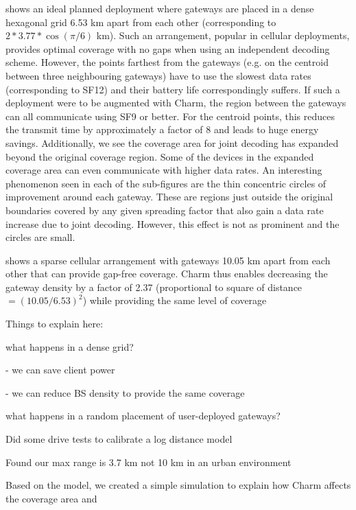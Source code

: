  shows an ideal planned deployment where gateways are placed in a dense hexagonal grid 6.53 km apart from each other (corresponding to $2*3.77*\cos(\pi/6)$ km). Such an arrangement, popular in cellular deployments, provides optimal coverage with no gaps when using an independent decoding scheme. However, the points farthest from the gateways (e.g. on the centroid between three neighbouring gateways) have to use the slowest data rates (corresponding to SF12) and their battery life correspondingly suffers. If such a deployment were to be augmented with Charm, the region between the gateways can all communicate using SF9 or better. For the centroid points, this reduces the transmit time by approximately a factor of 8 and leads to huge energy savings. Additionally, we see the coverage area for joint decoding has expanded beyond the original coverage region. Some of the devices in the expanded coverage area can even communicate with higher data rates. An interesting phenomenon seen in each of the sub-figures are the thin concentric circles of improvement around each gateway. These are regions just outside the original boundaries covered by any given spreading factor that also gain a data rate increase due to joint decoding. However, this effect is not as prominent and the circles are small.

 shows a sparse cellular arrangement with gateways 10.05 km apart from each other that can provide gap-free coverage. Charm thus enables decreasing the gateway density by a factor of 2.37 (proportional to square of  distance $=(10.05/6.53)^2$) while providing the same level of coverage

Things to explain here:


what happens in a dense grid?

- we can save client power

- we can reduce BS density to provide the same coverage

what happens in a random placement of user-deployed gateways?



Did some drive tests to calibrate a log distance model

Found our max range is 3.7 km not 10 km in an urban environment

Based on the model, we created a simple simulation to explain how Charm affects the coverage area and 


